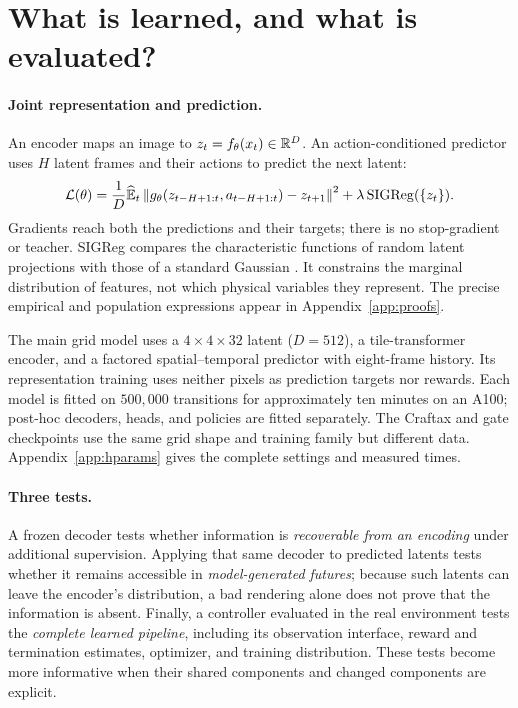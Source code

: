 \section{What is learned, and what is evaluated?}
\label{sec:worlds}

\paragraph{Joint representation and prediction.}
An encoder maps an image to $z_t=f_\theta(x_t)\in\mathbb{R}^D$. An action-conditioned predictor uses
$H$ latent frames and their actions to predict the next latent:
\begin{equation}
\label{eq:lewm}
\mathcal{L}(\theta)=\frac{1}{D}\widehat{\mathbb{E}}_t\left\|g_\theta(z_{t-H+1:t},a_{t-H+1:t})-z_{t+1}\right\|^2
+\lambda\,\mathrm{SIGReg}(\{z_t\}).
\end{equation}
Gradients reach both the predictions and their targets; there is no stop-gradient or teacher.
SIGReg compares the characteristic functions of random latent projections with those of a standard
Gaussian \citep{balestriero2025lejepa}. It constrains the marginal distribution of features, not which
physical variables they represent. The precise empirical and population expressions appear in
Appendix~\ref{app:proofs}.

The main grid model uses a $4\times4\times32$ latent ($D=512$), a tile-transformer encoder, and a
factored spatial--temporal predictor with eight-frame history. Its representation training uses
neither pixels as prediction targets nor rewards. Each model is fitted on $500{,}000$ transitions
for approximately ten minutes on an A100; post-hoc decoders, heads, and policies are fitted separately.
The Craftax and gate checkpoints use the same grid shape and training family but different data.
Appendix~\ref{app:hparams} gives the complete settings and measured times.

\paragraph{Three tests.}
A frozen decoder tests whether information is \emph{recoverable from an encoding} under additional
supervision. Applying that same decoder to predicted latents tests whether it remains accessible in
\emph{model-generated futures}; because such latents can leave the encoder's distribution, a bad
rendering alone does not prove that the information is absent. Finally, a controller evaluated in
the real environment tests the \emph{complete learned pipeline}, including its observation interface,
reward and termination estimates, optimizer, and training distribution. These tests become more
informative when their shared components and changed components are explicit.

